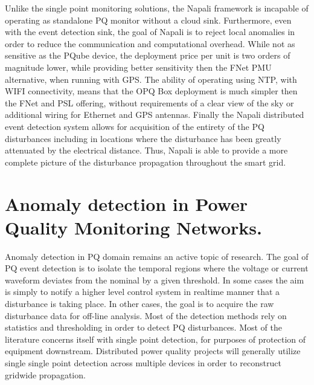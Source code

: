Unlike the single point monitoring solutions, the Napali framework is incapable of operating as standalone PQ monitor without a cloud sink. Furthermore, even with the event detection sink, the goal of Napali is to reject local anomalies in order to reduce the communication and computational overhead. While not as sensitive as the PQube device, the deployment price per unit is two orders of magnitude lower, while providing better sensitivity then the FNet PMU alternative, when running with GPS. The ability of operating using NTP, with WIFI connectivity, means that the OPQ Box deployment is much simpler then the FNet and PSL offering, without requirements of a clear view of the sky or additional wiring for Ethernet and GPS antennas. Finally the Napali distributed event detection system allows for acquisition of the entirety of the PQ disturbances including in locations where the disturbance has been greatly attenuated by the electrical distance. Thus, Napali is able to provide a more complete picture of the disturbance propagation throughout the smart grid.

\section{Anomaly detection in Power Quality Monitoring Networks.}

Anomaly detection in PQ domain remains an active topic of research. The goal of PQ event detection is to isolate the temporal regions where the voltage or current waveform deviates from the nominal by a given threshold. In some cases the aim is simply to notify a higher level control system in realtime manner that a disturbance is taking place. In other cases, the goal is to acquire the raw disturbance data for off-line analysis. Most of the detection methods rely on statistics and thresholding in order to detect PQ disturbances. Most of the literature concerns itself with single point detection, for purposes of protection of equipment downstream.\cite{gu2004statistical}\cite{karimi2000wavelet} \cite{shin2006power} Distributed power quality projects will generally utilize single single point detection across multiple devices in order to reconstruct gridwide propagation.\cite{von2014micro}

